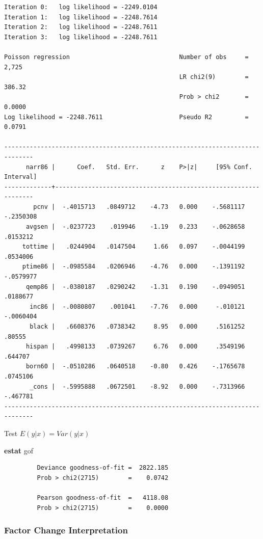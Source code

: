 \documentclass[
]{book}
\newenvironment{Shaded}{\begin{snugshade}}{\end{snugshade}}
\newcommand{\KeywordTok}[1]{\textcolor[rgb]{0.13,0.29,0.53}{\textbf{#1}}}
\newcommand{\NormalTok}[1]{#1}
\begin{document}
\begin{verbatim}
Iteration 0:   log likelihood = -2249.0104  
Iteration 1:   log likelihood = -2248.7614  
Iteration 2:   log likelihood = -2248.7611  
Iteration 3:   log likelihood = -2248.7611  

Poisson regression                              Number of obs     =      2,725
                                                LR chi2(9)        =     386.32
                                                Prob > chi2       =     0.0000
Log likelihood = -2248.7611                     Pseudo R2         =     0.0791

------------------------------------------------------------------------------
      narr86 |      Coef.   Std. Err.      z    P>|z|     [95% Conf. Interval]
-------------+----------------------------------------------------------------
        pcnv |  -.4015713   .0849712    -4.73   0.000    -.5681117   -.2350308
      avgsen |  -.0237723    .019946    -1.19   0.233    -.0628658    .0153212
     tottime |   .0244904   .0147504     1.66   0.097    -.0044199    .0534006
     ptime86 |  -.0985584   .0206946    -4.76   0.000    -.1391192   -.0579977
      qemp86 |  -.0380187   .0290242    -1.31   0.190    -.0949051    .0188677
       inc86 |  -.0080807    .001041    -7.76   0.000     -.010121   -.0060404
       black |   .6608376   .0738342     8.95   0.000     .5161252      .80555
      hispan |   .4998133   .0739267     6.76   0.000     .3549196     .644707
      born60 |  -.0510286   .0640518    -0.80   0.426    -.1765678    .0745106
       _cons |  -.5995888   .0672501    -8.92   0.000    -.7313966    -.467781
------------------------------------------------------------------------------
\end{verbatim}

Test \(E(y|x)=Var(y|x)\)

\begin{Shaded}
\begin{Highlighting}[]
\KeywordTok{estat}\NormalTok{ gof}
\end{Highlighting}
\end{Shaded}

\begin{verbatim}
         Deviance goodness-of-fit =  2822.185
         Prob > chi2(2715)        =    0.0742

         Pearson goodness-of-fit  =   4118.08
         Prob > chi2(2715)        =    0.0000
\end{verbatim}

\subsubsection*{Factor Change Interpretation}\label{factor-change-interpretation}
\end{document}
